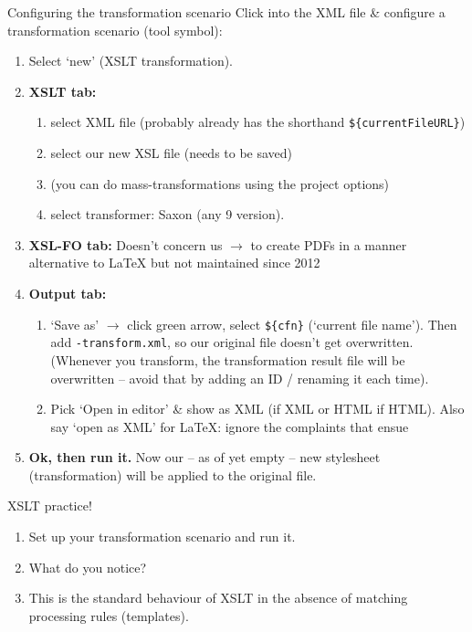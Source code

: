 \begin{frame}[fragile]{Configuring the transformation scenario}
Click into the XML file \& configure a transformation scenario (tool symbol):
\begin{multicols}{2}
\begin{enumerate}\footnotesize
    \item Select `new' (XSLT transformation).
    \item \textbf{XSLT tab: }
    \begin{enumerate}\scriptsize
        \item select XML file (probably already has the shorthand \verb|${currentFileURL}|)
        \item select our new XSL file (needs to be saved)
        \item (you can do mass-transformations using the project options)
        \item select transformer: Saxon (any 9 version).
    \end{enumerate}
    \item \textbf{XSL-FO tab:} {\scriptsize Doesn't concern us $\to$ to create PDFs in a manner alternative to \LaTeX{} but not maintained since 2012}
    \item \textbf{Output tab:} 
    \begin{enumerate}\scriptsize
        \item `Save as' $\to$ click green arrow, select \verb|${cfn}| (`current file name'). Then add \texttt{-transform.xml}, so our original file doesn't get overwritten. (Whenever you transform, the transformation result file will be overwritten -- avoid that by adding an ID / renaming it each time).
        \item Pick `Open in editor' \& show as XML (if XML or HTML if HTML). Also say `open as XML' for \LaTeX{}: ignore the complaints that ensue \faSmileO 
    \end{enumerate}
    \item \textbf{Ok, then run it.} \scriptsize Now our -- as of yet empty -- new stylesheet (transformation) will be applied to the original file. 
\end{enumerate}
\end{multicols}

\end{frame}

\begin{frame}[standout]
    \alert{XSLT practice!} \\
    \begin{enumerate}\small
        \item Set up your transformation scenario and run it.
        \item \alert{What do you notice?}
        \item This is the standard behaviour of XSLT in the absence of matching  processing rules (templates).
    \end{enumerate} 
\end{frame}

